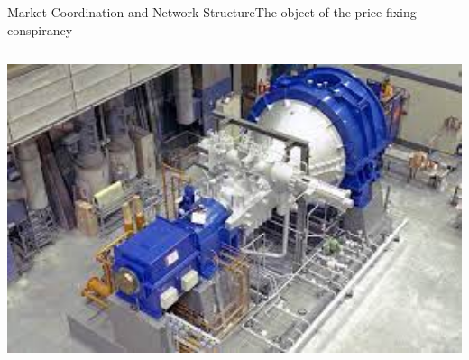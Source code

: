 \documentclass[notes, aspectratio=1610]{beamer}
\begin{document}
\begin{frame}{Market Coordination and Network Structure}{The object of the price-fixing conspirancy}
\begin{columns}
\begin{column}{0.33\textwidth}
			\includegraphics[width=1\textwidth]{images/turbine_generator}
		\end{column}
	\end{columns}
\end{frame}
\end{document}

